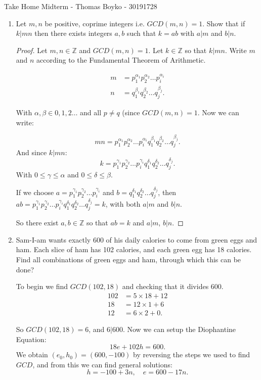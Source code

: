 \documentclass{article}
\begin{document}
    \huge Take Home Midterm - Thomas Boyko - 30191728
    \normalsize
\begin{enumerate} 
\item Let $m, n$ be positive, coprime integers i.e. $GCD(m, n) = 1$. Show that if $k|mn$ then there
exists integers $a, b$ such that $k = ab$ with $a|m$ and $b|n$.
\begin{proof} 
Let $m,n\in\mathbb{Z}$ and $GCD(m,n)=1$. Let $k\in\mathbb{Z}$ so that $k|mn$. 
Write $m$ and $n$ according to the Fundamental Theorem of Arithmetic.

\begin{align*}
    m&=p_1^{\alpha_1}p_2^{\alpha_2}\ldots p_i^{\alpha_i}\\
    n&=q_1^{\beta_1}q_2^{\beta_2}\ldots q_j^{\beta_j}  
.\end{align*}

With $\alpha,\beta\in 0,1,2\ldots$ and all $p\neq q$ (since $GCD(m,n)=1$. Now we can write:

\[
mn=p_1^{\alpha_1}p_2^{\alpha_2}\ldots p_i^{\alpha_i}q_1^{\beta_1}q_2^{\beta_2}\ldots q_j^{\beta_j}  
   .\] 
   And since $k|mn$:
   \[
   k=p_1^{\gamma_1}p_2^{\gamma_2}\ldots p_i^{\gamma_i}q_1^{\delta_1}q_2^{\delta_2}\ldots q_j^{\delta_j} 
   .\] 
   With $0\le \gamma\le \alpha$ and $0\le \delta\le\beta$.

   If we choose $a=p_1^{\gamma_1}p_2^{\gamma_2}\ldots p_i^{\gamma_i}$ and 
   $b=q_1^{\delta_1}q_2^{\delta_2}\ldots q_j^{\delta_j}$, then 
   $ab=p_1^{\gamma_1}p_2^{\gamma_2}\ldots p_i^{\gamma_i}q_1^{\delta_1}q_2^{\delta_2}\ldots q_j^{\delta_j}
   = k$, with both $a|m$ and $b|n$.

   So there exist $a,b\in \mathbb{Z}$ so that $ab=k$ and $a|m$, $b|n$.
\end{proof}
\item  Sam-I-am wants exactly 600 of his daily calories to come from green eggs and ham. Each slice
of ham has 102 calories, and each green egg has 18 calories. Find all combinations of green
eggs and ham, through which this can be done?

To begin we find $GCD(102,18)$ and checking that it divides $600$.
\begin{align*}
    102&=5\times 18+12\\
    18&= 12\times 1+6 \\
    12&=6\times 2+0  
.\end{align*}

So $GCD(102,18)=6$, and $6|600$. Now we can setup the Diophantine Equation: 
\[
18e+102h=600
.\] 
We obtain $(e_0,h_0)=(600,-100)$ by reversing the steps we used to find $GCD$, 
and from this we can find general solutions:
\[
h=-100+3n,\quad e=600-17n
.\] 


\end{enumerate}
\end{document}
